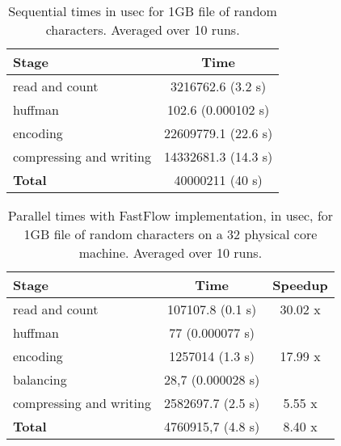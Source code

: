 \documentclass[12pt, letterpaper]{article}  %
\begin{document}
\begin{table}[h]
\begin{center}
\begin{tabular}{l c}
    \textbf{Stage} & \textbf{Time}  \\
    \hline
    read and count & 3216762.6 (3.2 s)\\
    \hline
    huffman & 102.6 (0.000102 s)\\
    \hline
    encoding & 22609779.1 (22.6 s)  \\
    \hline
    compressing and writing & 14332681.3 (14.3 s) \\
    \hline
    \textbf{Total} & 40000211 (40 s)\\ 
\end{tabular}
\caption{Sequential times in usec for 1GB file of random characters. Averaged over 10 runs.}
\label{tab:sequential_times}
\end{center}
\end{table}


\begin{table}[h]
\begin{center}
\begin{tabular}{l c c}
    \textbf{Stage} & \textbf{Time} & \textbf{Speedup} \\
    \hline
    read and count & 107107.8 (0.1 s) & 30.02 x \\
    \hline
    huffman & 77 (0.000077 s) &  \\
    \hline
    encoding & 1257014 (1.3 s) &  17.99 x\\
    \hline
    balancing & 28,7 (0.000028 s) \\
    \hline
    compressing and writing & 2582697.7 (2.5 s) & 5.55 x \\
    \hline
    \textbf{Total} & 4760915,7 (4.8 s)  & 8.40 x\\ 
\end{tabular}
\caption{Parallel times with FastFlow implementation, in usec, for 1GB file of random characters on a 32 physical core machine. Averaged over 10 runs.}
\label{tab:ff_times}
\end{center}
\end{table}
\end{document}
